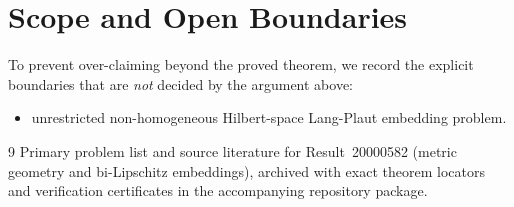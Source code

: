 \documentclass[10pt,reqno]{amsart}
\theoremstyle{definition}
\begin{document}
\section{Scope and Open Boundaries}

To prevent over-claiming beyond the proved theorem, we record the explicit boundaries that are \emph{not} decided by the argument above:
\begin{itemize}
  \item unrestricted non-homogeneous Hilbert-space Lang-Plaut embedding problem.
\end{itemize}

\begin{thebibliography}{9}
Primary problem list and source literature for Result~20000582 (metric geometry and bi-Lipschitz embeddings), archived with exact theorem locators and verification certificates in the accompanying repository package.
\end{thebibliography}
\end{document}
